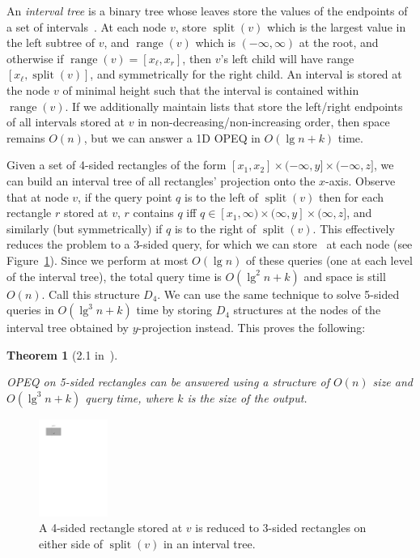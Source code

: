 \documentclass[letterpaper,12pt,twocolumn]{article}
\DeclareMathOperator{\splt}{split}
\DeclareMathOperator{\range}{range}
\newcommand{\BigOh}[1]{O\!\left(#1\right)}
\newcommand\D[1]{$D_{#1}$}
\newcommand\bounds[1]{[#1]}
\newcommand\lbounds[1]{(#1]} %
\newcommand\rbounds[1]{[#1)} %
\theoremstyle{plain}
\newtheorem{theorem}{Theorem}
\begin{document}
An \emph{interval tree} is a binary tree whose leaves store the values
of the endpoints of a set of intervals~\cite{edelsbrunner1983new}.  At
each node $v$, store $\splt(v)$ which is the largest value in the left
subtree of $v$, and $\range(v)$ which is $(-\infty,\infty)$ at the
root, and otherwise if $\range(v) = [x_\ell, x_r]$, then $v$'s left
child will have range $[x_\ell, \splt(v)]$, and symmetrically for the
right child.  An interval is stored at the node $v$ of minimal height
such that the interval is contained within $\range(v)$.  If we
additionally maintain lists that store the left/right endpoints of all
intervals stored at $v$ in non-decreasing/non-increasing order, then
space remains $\BigOh{n}$, but we can answer a 1D OPEQ in $\BigOh{\lg
  n + k}$ time.

Given a set of 4-sided rectangles of the form $\bounds{x_1,x_2} \times
\lbounds{-\infty, y} \times \lbounds{-\infty,z}$, we can build an
interval tree of all rectangles' projection onto the $x$-axis.
Observe that at node $v$, if the query point $q$ is to the left of
$\splt(v)$ then for each rectangle $r$ stored at $v$, $r$ contains $q$
iff $q \in \rbounds{x_1, \infty} \times \lbounds{\infty, y} \times
\lbounds{\infty, z}$, and similarly (but symmetrically) if $q$ is to
the right of $\splt(v)$.  This effectively reduces the problem to a
3-sided query, for which we can store~\cite{afshani2008dominance} at
each node (see Figure~\ref{fig:4sided:3sided}).  Since we perform at
most $\BigOh{\lg n}$ of these queries (one at each level of the
interval tree), the total query time is $\BigOh{\lg^2 n + k}$ and
space is still $\BigOh{n}$.  Call this structure \D{4}.  We can use
the same technique to solve 5-sided queries in $\BigOh{\lg^3 n + k}$
time by storing \D{4} structures at the nodes of the interval tree
obtained by $y$-projection instead.  This proves the following:

\begin{theorem}[2.1 in~\cite{rahul2015improved}]\label{thm:21}

  OPEQ on 5-sided rectangles can be answered using a structure of
  $\BigOh{n}$ size and $\BigOh{\lg^3 n + k}$ query time, where $k$
  is the size of the output.

\end{theorem}

\begin{figure}[t!]
  \centering
    \includegraphics[width=0.20\textwidth,page=1]{figures/4-sided-to-3-sided}
  \caption[4-sided to 3-sided]{A 4-sided rectangle stored at $v$ is
    reduced to 3-sided rectangles on either side of $\splt(v)$ in an
    interval tree.}\label{fig:4sided:3sided}
\end{figure}
\end{document}
